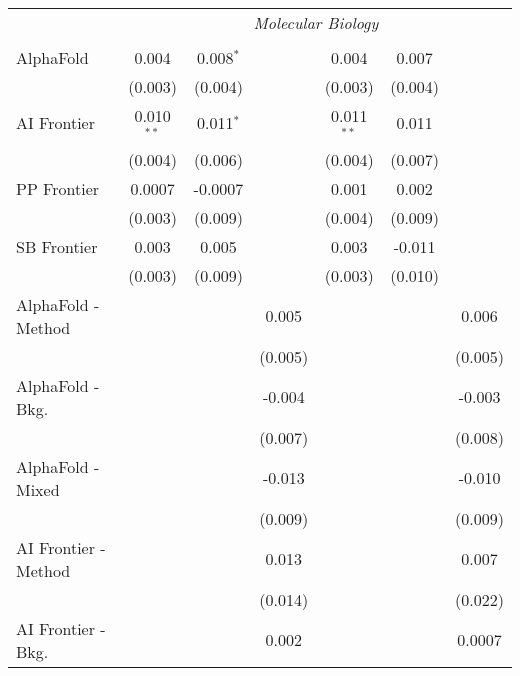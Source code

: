 \begin{tabular}{lcccccc}
 & \multicolumn{6}{c}{\textit{Molecular Biology}} \\ \\
   AlphaFold            & 0.004        & 0.008$^{*}$ &                & 0.004        & 0.007   &   \\   
                        & (0.003)      & (0.004)     &                & (0.003)      & (0.004) &   \\   
   AI Frontier          & 0.010$^{**}$ & 0.011$^{*}$ &                & 0.011$^{**}$ & 0.011   &   \\   
                        & (0.004)      & (0.006)     &                & (0.004)      & (0.007) &   \\   
   PP Frontier          & 0.0007       & -0.0007     &                & 0.001        & 0.002   &   \\   
                        & (0.003)      & (0.009)     &                & (0.004)      & (0.009) &   \\   
   SB Frontier          & 0.003        & 0.005       &                & 0.003        & -0.011  &   \\   
                        & (0.003)      & (0.009)     &                & (0.003)      & (0.010) &   \\   
   AlphaFold - Method   &              &             & 0.005          &              &         & 0.006\\   
                        &              &             & (0.005)        &              &         & (0.005)\\   
   AlphaFold - Bkg.     &              &             & -0.004         &              &         & -0.003\\   
                        &              &             & (0.007)        &              &         & (0.008)\\   
   AlphaFold - Mixed    &              &             & -0.013         &              &         & -0.010\\   
                        &              &             & (0.009)        &              &         & (0.009)\\   
   AI Frontier - Method &              &             & 0.013          &              &         & 0.007\\   
                        &              &             & (0.014)        &              &         & (0.022)\\   
   AI Frontier - Bkg.   &              &             & 0.002          &              &         & 0.0007\\   

\end{tabular}
